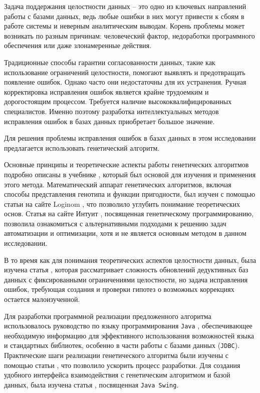 \documentclass[master,paper]{pmk-graduate}
\begin{document}
Задача поддержания целостности данных -- это одно из ключевых направлений работы с базами данных, ведь любые ошибки в них могут привести к сбоям в работе системы и неверным аналитическим выводам. Корень проблемы может возникать по разным причинам: человеческий фактор, недоработки программного обеспечения или даже злонамеренные действия.

Традиционные способы гарантии согласованности данных, такие как использование ограничений целостности, помогают выявлять и предотвращать появление ошибок. Однако часто они недостаточны для их устранения. Ручная корректировка исправления ошибок является крайне трудоемким и дорогостоящим процессом. Требуется наличие высококвалифицированных специалистов. Именно поэтому разработка интеллектуальных методов исправления ошибок в базах данных приобретает большое значение.

\review
Для решения проблемы исправления ошибок в базах данных в этом иссле\-довании предлагается использовать генетический алгоритм.

Основные принципы и теоретические аспекты работы генетических алгоритмов подробно описаны в учебнике \cite{bib1}, который был основой для изучения и применения этого метода. Математический аппарат генетических алгоритмов, включая способы представления генотипа и функции пригодности, был изучен с помощью статьи на сайте Loginom \cite{bib2}, что позволило углубить понимание теоретических основ. Статья на сайте Интуит \cite{bib3}, посвященная генетическому программированию, позволила ознакомиться с альтернативными подходами к решению задач автоматизации и оптимизации, хотя и не являет\-ся основным методом в данном исследовании.

В то время как для понимания теоретических аспектов целостности данных, была изучена статья \cite{bib4}, которая рассматривает сложность обновлений дедуктивных баз данных с фиксированными ограничениями целостности, но задача исправления ошибок, требующая создания и проверки гипотез о возможных коррекциях остается малоизученной.

Для разработки программной реализации предложенного алгоритма использовалось руководство по языку программирования \texttt{Java} \cite{bib5}, обеспечи\-вающее необходимую информацию для эффективного использования возможностей языка и стандартных библиотек, особенно в части работы с базами данных (\texttt{JDBC}). Практические шаги реализации генетического алгоритма были изучены с помощью статьи \cite{bib6}, что позволило ускорить процесс разработки. Для создания удобного интерфейса взаимодейст\-вия с генетическим алгоритмом и базой данных, была изучена статья \cite{bib7}, посвященная \texttt{Java Swing}.
\end{document}
